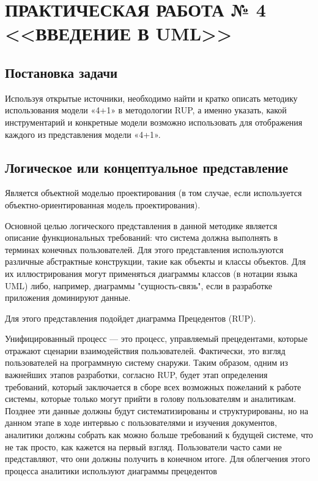 \chapter{ПРАКТИЧЕСКАЯ РАБОТА № 4 <<ВВЕДЕНИЕ В UML>>}

\section{Постановка задачи}

Используя открытые источники, необходимо найти и кратко описать методику использования модели «4+1» в методологии RUP, а именно указать, какой инструментарий и конкретные модели возможно использовать для отображения каждого из представления модели «4+1».

\section{Логическое или концептуальное представление}

Является объектной моделью проектирования (в том случае, если используется объектно-ориентированная модель проектирования).

Основной целью логического представления в данной методике является описание функциональных требований: что система должна выполнять в терминах конечных пользователей. Для этого представления используются различные абстрактные конструкции, такие как объекты и классы объектов. Для их иллюстрирования могут применяться диаграммы классов (в нотации языка UML) либо, например, диаграммы "сущность-связь", если в разработке приложения доминируют данные.

Для этого представления подойдет диаграмма Прецедентов (RUP).


Унифицированный процесс --- это процесс, управляемый прецедентами, которые отражают сценарии взаимодействия пользователей. Фактически, это взгляд пользователей на программную систему снаружи. Таким образом, одним из важнейших этапов разработки, согласно RUP, будет этап определения требований, который заключается в сборе всех возможных пожеланий к работе системы, которые только могут прийти в голову пользователям и аналитикам. Позднее эти данные должны будут систематизированы и структурированы, но на данном этапе в ходе интервью с пользователями и изучения документов, аналитики должны собрать как можно больше требований к будущей системе, что не так просто, как кажется на первый взгляд. Пользователи часто сами не представляют, что они должны получить в конечном итоге. Для облегчения этого процесса аналитики используют диаграммы прецедентов

